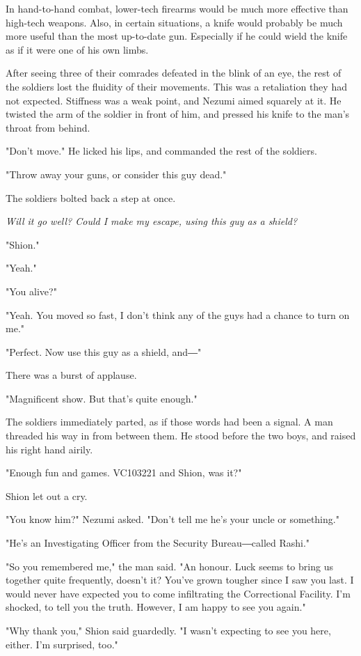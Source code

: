 In hand-to-hand combat, lower-tech firearms would be much more effective
than high-tech weapons. Also, in certain situations, a knife would
probably be much more useful than the most up-to-date gun. Especially if
he could wield the knife as if it were one of his own limbs.

After seeing three of their comrades defeated in the blink of an eye,
the rest of the soldiers lost the fluidity of their movements. This was
a retaliation they had not expected. Stiffness was a weak point, and
Nezumi aimed squarely at it. He twisted the arm of the soldier in front
of him, and pressed his knife to the man's throat from behind.

"Don't move." He licked his lips, and commanded the rest of the
soldiers.

"Throw away your guns, or consider this guy dead."

The soldiers bolted back a step at once.

\emph{Will it go well? Could I make my escape, using this guy as a shield?}

"Shion."

"Yeah."

"You alive?"

"Yeah. You moved so fast, I don't think any of the guys had a chance to
turn on me."

"Perfect. Now use this guy as a shield, and―"

There was a burst of applause.

"Magnificent show. But that's quite enough."

The soldiers immediately parted, as if those words had been a signal. A
man threaded his way in from between them. He stood before the two boys,
and raised his right hand airily.

"Enough fun and games. VC103221 and Shion, was it?"

Shion let out a cry.

"You know him?" Nezumi asked. "Don't tell me he's your uncle or
something."

"He's an Investigating Officer from the Security Bureau―called Rashi."

"So you remembered me," the man said. "An honour. Luck seems to bring us
together quite frequently, doesn't it? You've grown tougher since I saw
you last. I would never have expected you to come infiltrating the
Correctional Facility. I'm shocked, to tell you the truth. However, I am
happy to see you again."

"Why thank you," Shion said guardedly. "I wasn't expecting to see you
here, either. I'm surprised, too."

